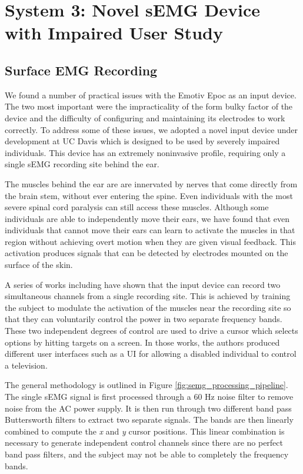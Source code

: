 \section*{System 3: Novel sEMG Device with Impaired User Study}
\setcounter{subsection}{0}
\renewcommand*{\theHsection}{chX.\the\value{section}}
\subsection{Surface EMG Recording}
\label{sec:semg_hardware}
We found a number of practical issues with the Emotiv Epoc as an input device. The two most important were the impracticality of the form bulky factor of the device and the difficulty of configuring and maintaining its electrodes to work correctly. To address some of these issues, we adopted a novel input device under development at UC Davis which is designed to be used by severely impaired individuals. This device has an extremely noninvasive profile, requiring only a single sEMG recording site behind the ear. 

The muscles behind the ear are are innervated by nerves that come directly from the brain stem, without ever entering the spine. Even individuals with the most severe spinal cord paralysis can still access these muscles. Although some individuals are able to independently move their ears, we have found that even individuals that cannot move their ears can learn to activate the muscles in that region without achieving overt motion when they are given visual feedback. This activation produces signals that can be detected by electrodes mounted on the surface of the skin. 

A series of works including \cite{joshisensor,JoshiTwoDimCursor,JoshiEPLPilot} have shown that the input device can record two simultaneous channels from a single recording site. This is achieved by training the subject to modulate the activation of the muscles near the recording site so that they can voluntarily control the power in two separate frequency bands. These two independent degrees of control are used to drive a cursor which selects options by hitting targets on a screen. In those works, the authors produced different user interfaces such as a UI for allowing a disabled individual to control a television. 

The general methodology is outlined in Figure \ref{fig:semg_processing_pipeline}. The single sEMG signal is first processed through a 60 Hz noise filter to remove noise from the AC power supply. It is then run through two different band pass Buttersworth filters to extract two separate signals. The bands are then linearly combined to compute the \emph{x} and \emph{y} cursor positions. This linear combination is necessary to generate independent control channels since there are no perfect band pass filters, and the subject may not be able to completely the frequency bands. 

